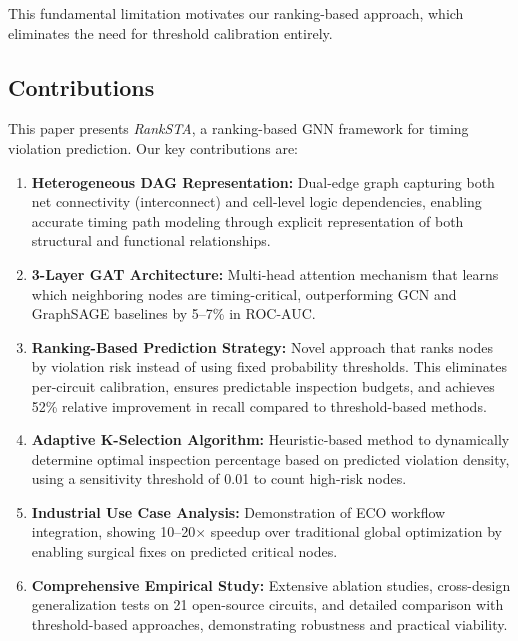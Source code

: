 \documentclass[10pt,twocolumn,journal]{IEEEtran}
\begin{document}
This fundamental limitation motivates our ranking-based approach, which eliminates the need for threshold calibration entirely.

\subsection{Contributions}

This paper presents \textit{RankSTA}, a ranking-based GNN framework for timing violation prediction. Our key contributions are:

\begin{enumerate}
    \item \textbf{Heterogeneous DAG Representation:} Dual-edge graph capturing both net connectivity (interconnect) and cell-level logic dependencies, enabling accurate timing path modeling through explicit representation of both structural and functional relationships.
    
    \item \textbf{3-Layer GAT Architecture:} Multi-head attention mechanism that learns which neighboring nodes are timing-critical, outperforming GCN and GraphSAGE baselines by 5--7\% in ROC-AUC.
    
    \item \textbf{Ranking-Based Prediction Strategy:} Novel approach that ranks nodes by violation risk instead of using fixed probability thresholds. This eliminates per-circuit calibration, ensures predictable inspection budgets, and achieves 52\% relative improvement in recall compared to threshold-based methods.
    
    \item \textbf{Adaptive K-Selection Algorithm:} Heuristic-based method to dynamically determine optimal inspection percentage based on predicted violation density, using a sensitivity threshold of 0.01 to count high-risk nodes.
    
    \item \textbf{Industrial Use Case Analysis:} Demonstration of ECO workflow integration, showing 10--20$\times$ speedup over traditional global optimization by enabling surgical fixes on predicted critical nodes.
    
    \item \textbf{Comprehensive Empirical Study:} Extensive ablation studies, cross-design generalization tests on 21 open-source circuits, and detailed comparison with threshold-based approaches, demonstrating robustness and practical viability.
\end{enumerate}
\end{document}
